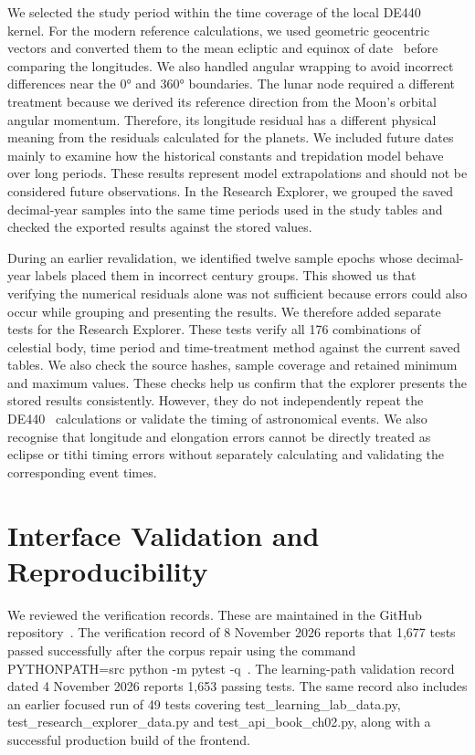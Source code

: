 \documentclass[12pt,a4paper,oneside]{report}
\begin{document}
We selected the study period within the time coverage of the local DE440~\cite{Park2021DE440} kernel. For the modern reference calculations, we used geometric geocentric vectors and converted them to the mean ecliptic and equinox of date~\cite{capitaine2003,hilton2006} before comparing the longitudes. We also handled angular wrapping to avoid incorrect differences near the 0° and 360° boundaries. The lunar node required a different treatment because we derived its reference direction from the Moon's orbital angular momentum. Therefore, its longitude residual has a different physical meaning from the residuals calculated for the planets. We included future dates mainly to examine how the historical constants and trepidation model behave over long periods. These results represent model extrapolations and should not be considered future observations. In the Research Explorer, we grouped the saved decimal-year samples into the same time periods used in the study tables and checked the exported results against the stored values.

During an earlier revalidation, we identified twelve sample epochs whose decimal-year labels placed them in incorrect century groups. This showed us that verifying the numerical residuals alone was not sufficient because errors could also occur while grouping and presenting the results. We therefore added separate tests for the Research Explorer. These tests verify all 176 combinations of celestial body, time period and time-treatment method against the current saved tables. We also check the source hashes, sample coverage and retained minimum and maximum values. These checks help us confirm that the explorer presents the stored results consistently. However, they do not independently repeat the DE440~\cite{Park2021DE440} calculations or validate the timing of astronomical events. We also recognise that longitude and elongation errors cannot be directly treated as eclipse or tithi timing errors without separately calculating and validating the corresponding event times.

\section{Interface Validation and Reproducibility}

We reviewed the verification records. These are maintained in the GitHub repository~\cite{nigam_repo}. The verification record of 8 November 2026 reports that 1,677 tests passed successfully after the corpus repair using the command PYTHONPATH=src python -m pytest -q~\cite{pytest}. The learning-path validation record dated 4 November 2026 reports 1,653 passing tests. The same record also includes an earlier focused run of 49 tests covering test\_learning\_lab\_data.py, test\_research\_explorer\_data.py and test\_api\_book\_ch02.py, along with a successful production build of the frontend.
\end{document}
